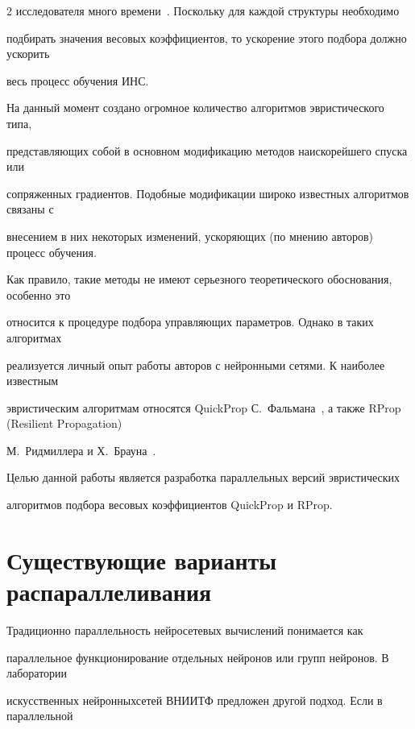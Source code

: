 \begin{multicols}{2}
исследователя много времени~\cite{2kr}. Поскольку для каждой структуры необходимо


подбирать значения весовых коэффициентов, то ускорение этого подбора должно ускорить


весь процесс обучения ИНС.





 На данный момент создано огромное количество алгоритмов эвристического типа,


представляющих собой в основном модификацию методов наи\-ско\-рей\-шего спуска или


сопряженных градиентов. Подобные модификации широко известных алгоритмов связаны с


внесением в них некоторых изменений, ускоряющих (по мнению авторов) процесс обучения.


Как правило, такие методы не имеют серьезного теоретического обоснования, особенно это


относится к процедуре подбора управ\-ля\-ющих параметров. Однако в таких алгоритмах\linebreak


реализуется личный опыт работы авторов с ней\-ронными сетями. К наиболее известным


эвристическим алгоритмам относятся QuickProp С.~Фальмана~\cite{8kr}, а также RProp (Resilient Propagation)\linebreak


М.~Ридмиллера и Х.~Брауна~\cite{7kr}.





 Целью данной работы является разработка параллельных версий эвристических


алгоритмов подбора весовых коэффициентов QuickProp и RProp.





\section{Существующие варианты распараллеливания}





 Традиционно параллельность нейросетевых вычислений понимается как


параллельное функ\-цио\-ни\-ро\-ва\-ние отдельных нейронов или групп нейронов. В лаборатории


искусственных нейронных\linebreak сетей ВНИИТФ предложен другой подход. Если в параллельной



\end{multicols}
